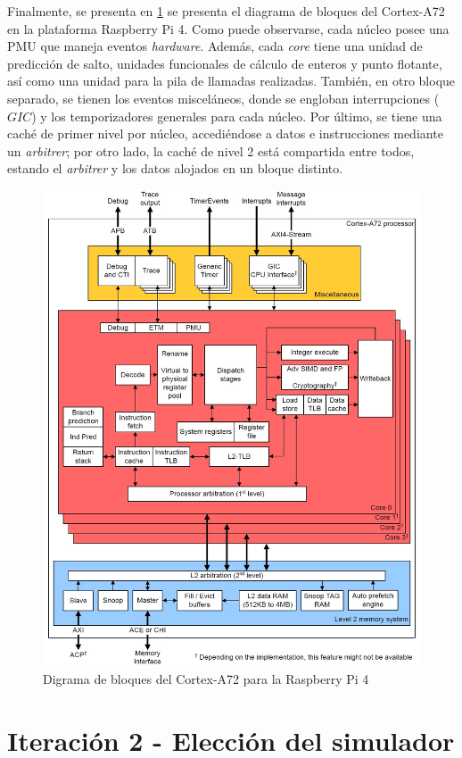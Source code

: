 \vspace*{-0.2cm}

Finalmente, se presenta en \ref{fig:arquitecturaA72} se presenta el diagrama de bloques del Cortex-A72 en la plataforma Raspberry Pi 4. Como puede observarse, cada núcleo posee una \ac{PMU} que maneja eventos \textit{hardware}. Además, cada \textit{core} tiene una unidad de predicción de salto, unidades funcionales de cálculo de enteros y punto flotante, así como una unidad para la pila de llamadas realizadas. También, en otro bloque separado, se tienen los eventos misceláneos, donde se engloban interrupciones ($GIC$) y los temporizadores generales para cada núcleo. Por último, se tiene una caché de primer nivel por núcleo, accediéndose a datos e instrucciones mediante un \textit{arbitrer}; por otro lado, la caché de nivel 2 está compartida entre todos, estando el \textit{arbitrer} y los datos alojados en un bloque distinto.

\begin{figure}[H]
    \centering
    \includegraphics[width=0.75\linewidth, height=0.85\textwidth]{figs/Cortex-A72-BlockDiagram.jpg}
    \caption{Digrama de bloques del Cortex-A72 para la Raspberry Pi 4 \cite{datasheetA72}}
    \label{fig:arquitecturaA72}
\end{figure}

\pagebreak

\section{Iteración 2 - Elección del simulador}
\label{it2:eleccionSimulador}


